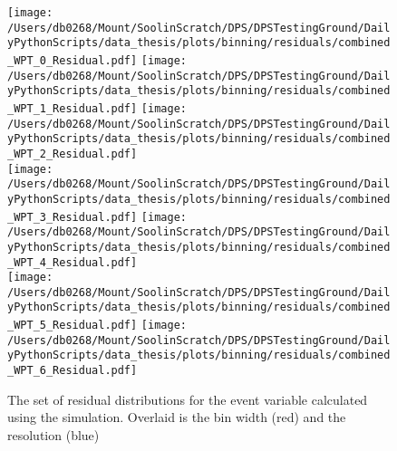 \begin{figure}[htpb]
	\centering
	\texttt{[image: /Users/db0268/Mount/SoolinScratch/DPS/DPSTestingGround/DailyPythonScripts/data\_thesis/plots/binning/residuals/combined\_WPT\_0\_Residual.pdf]}
	\texttt{[image: /Users/db0268/Mount/SoolinScratch/DPS/DPSTestingGround/DailyPythonScripts/data\_thesis/plots/binning/residuals/combined\_WPT\_1\_Residual.pdf]}
	\texttt{[image: /Users/db0268/Mount/SoolinScratch/DPS/DPSTestingGround/DailyPythonScripts/data\_thesis/plots/binning/residuals/combined\_WPT\_2\_Residual.pdf]} \\
	\texttt{[image: /Users/db0268/Mount/SoolinScratch/DPS/DPSTestingGround/DailyPythonScripts/data\_thesis/plots/binning/residuals/combined\_WPT\_3\_Residual.pdf]} 
	\texttt{[image: /Users/db0268/Mount/SoolinScratch/DPS/DPSTestingGround/DailyPythonScripts/data\_thesis/plots/binning/residuals/combined\_WPT\_4\_Residual.pdf]} \\
	\texttt{[image: /Users/db0268/Mount/SoolinScratch/DPS/DPSTestingGround/DailyPythonScripts/data\_thesis/plots/binning/residuals/combined\_WPT\_5\_Residual.pdf]}
	\texttt{[image: /Users/db0268/Mount/SoolinScratch/DPS/DPSTestingGround/DailyPythonScripts/data\_thesis/plots/binning/residuals/combined\_WPT\_6\_Residual.pdf]} \\
	\caption[The set of residual distributions for the \WPT{} event variable calculated using the \powhegpythia{} simulation. Overlaid is the bin width (red) and the resolution (blue)]{The set of residual distributions for the \WPT{} event variable calculated using the \powhegpythia{} simulation. Overlaid is the bin width (red) and the resolution (blue)}
	\label{fig:ResWPT}
\end{figure}
